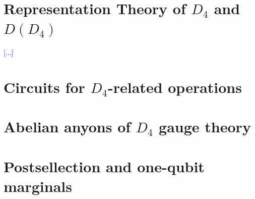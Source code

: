 \documentclass[two column]{article}
\newcommand{\jovan}[1]{\textcolor{blue}{[#1]}}
\begin{document}
\section{Representation Theory of $D_4$ and $D(D_4)$}\label{app:reps}
\jovan{$\ldots$}
\section{Circuits for $D_4$-related operations}\label{app:cirqs}
\section{Abelian anyons of $D_4$ gauge theory}\label{app:abl}
\section{Postsellection and one-qubit marginals}\label{app:marg}



\end{document}
